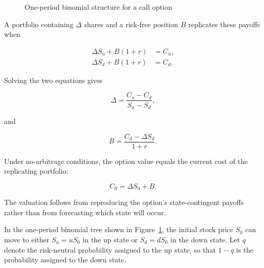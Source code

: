 \begin{figure}[H]
\centering
{}

\caption{One-period binomial structure for a call option}
\label{fig:ch18-one-period-binomial}
\end{figure}

A portfolio containing \(\Delta\) shares and a risk-free position \(B\) replicates these payoffs when

\begin{align*}
\Delta S_u+B(1+r)&=C_u,\\
\Delta S_d+B(1+r)&=C_d.
\end{align*}

Solving the two equations gives

\begin{equation}
\Delta
=\frac{C_u-C_d}{S_u-S_d},
\label{eq:ch18-binomial-delta}
\end{equation}

and

\begin{equation}
B
=\frac{C_d-\Delta S_d}{1+r}.
\label{eq:ch18-binomial-bond}
\end{equation}

Under no-arbitrage conditions, the option value equals the current cost of the replicating portfolio:

\begin{equation}
C_0=\Delta S_0+B.
\label{eq:ch18-binomial-value}
\end{equation}

The valuation follows from reproducing the option's state-contingent payoffs rather than from forecasting which state will occur.

In the one-period binomial tree shown in
Figure~\ref{fig:ch18-one-period-binomial}, the initial stock
price $S_0$ can move to either $S_{u}=uS_0$ in the up state
or $S_{d}=dS_0$ in the down state. Let $q$ denote the
risk-neutral probability assigned to the up state,
so that $1-q$ is the probability assigned to the
down state.

